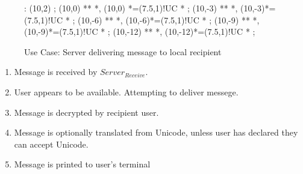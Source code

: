 \begin{figure}[Hbt]

\xy<1cm,0cm>:
(10,2) ; (10,0) **\dir{=} *\dir{>},
(10,0) *=(7.5,1)!UC *\frm{-} ;
(10,-3) **\dir{-} *\dir{>},
(10,-3)*=(7.5,1)!UC *\frm{-} ; 
(10,-6) **\dir{-} *\dir{>},
(10,-6)*=(7.5,1)!UC *\frm{-} ; 
(10,-9) **\dir{-} *\dir{>},
(10,-9)*=(7.5,1)!UC *\frm{=} ; 
(10,-12) **\dir{-} *\dir{>},
(10,-12)*=(7.5,1)!UC *\frm{-} ; 
\endxy

\caption{Use Case: Server delivering message to local recipient}

\end{figure}

\begin{enumerate}

\item Message is received by $Server_{Receive}$.

\item User appears to be available. Attempting to deliver messege.

\item Message is decrypted by recipient user. 

\item Message is optionally translated from Unicode, unless user has
declared they can accept Unicode. 

\item Message is printed to user's terminal

\end{enumerate}
